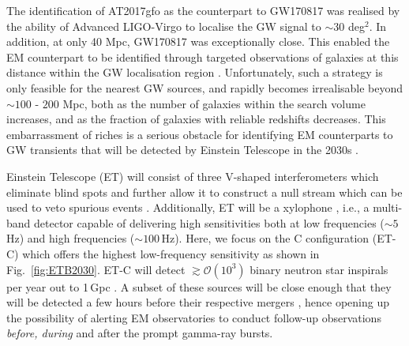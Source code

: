 \documentclass{aa}
\begin{document}
The identification of AT2017gfo as the counterpart to GW170817 was realised by the 
ability of Advanced LIGO-Virgo to localise the GW signal to $\sim$30 deg$^2$.
In addition, at only 40 Mpc, GW170817 was exceptionally close. This enabled the EM counterpart to be identified through targeted observations of galaxies at this distance within the GW localisation region \citep{Coul17}. Unfortunately, such a strategy is only feasible for the nearest GW sources, and rapidly becomes irrealisable beyond $\sim100$ - $200$ Mpc, both as the number of galaxies within the search volume increases, and as the fraction of galaxies with reliable redshifts decreases. 
This embarrassment of riches is a serious obstacle for identifying EM counterparts to GW transients that will be detected by Einstein Telescope in the 2030s \citep{ET_doc}.

 Einstein Telescope (ET) will consist of three
 V-shaped interferometers which eliminate blind spots and further allow it to construct a null
 stream \citep{Sathyaprakash:2012jk} which can be used to veto spurious events \citep{Wen:2005ui}. 
 Additionally, ET will be a xylophone \citep{Hild:2009ns}, i.e., a multi-band detector capable of delivering high sensitivities both at low frequencies ($\sim 5\,$Hz) and high frequencies ($\sim 100\,$Hz). 
 Here, we focus on the C configuration (ET-C) which offers the highest low-frequency sensitivity as shown in Fig.~\ref{fig:ETB2030}.
 ET-C will detect $\gtrsim\mathcal{O}(10^3)$ binary neutron star inspirals per year out to 1\,Gpc \citep{Akcay18}.  %
 A subset of these sources will be close enough that they will be detected a few hours
before their respective mergers \citep{Akcay18}, hence opening up the possibility of alerting EM
observatories to conduct follow-up observations \emph{before, during} and after the prompt gamma-ray bursts. 
\end{document}
